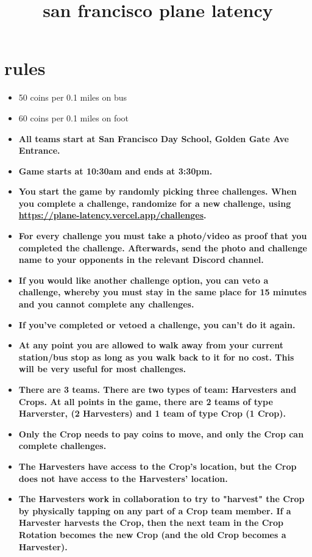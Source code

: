 \documentclass{article}
\title{san francisco plane latency}
\author{}
\date{}
\begin{document}
\maketitle

\section{rules}
\begin{itemize}
    \item 50 coins per 0.1 miles on bus
    \item 60 coins per 0.1 miles on foot
    \item \textbf{All teams start at San Francisco Day School, Golden Gate Ave Entrance.}
    \item \textbf{Game starts at 10:30am and ends at 3:30pm.}
    \item \textbf{You start the game by randomly picking three challenges. When you complete a challenge, randomize for a new challenge, using \url{https://plane-latency.vercel.app/challenges}.}
    \item \textbf{For every challenge you must take a photo/video as proof that you completed the challenge. Afterwards, send the photo and challenge name to your opponents in the relevant Discord channel.}
    \item \textbf{If you would like another challenge option, you can veto a challenge, whereby you must stay in the same place for 15 minutes and you cannot complete any challenges.}
    \item \textbf{If you've completed or vetoed a challenge, you can't do it again.}
    \item \textbf{At any point you are allowed to walk away from your current station/bus stop as long as you walk back to it for no cost. This will be very useful for most challenges.}
    \item \textbf{There are 3 teams. There are two types of team: Harvesters and Crops. At all points in the game, there are 2 teams of type Harverster, (2 Harvesters) and 1 team of type Crop (1 Crop).}
    \item \textbf{Only the Crop needs to pay coins to move, and only the Crop can complete challenges.}
    \item \textbf{The Harvesters have access to the Crop's location, but the Crop does not have access to the Harvesters' location.}
    \item \textbf{The Harvesters work in collaboration to try to "harvest" the Crop by physically tapping on any part of a Crop team member. If a Harvester harvests the Crop, then the next team in the Crop Rotation becomes the new Crop (and the old Crop becomes a Harvester). }

\end{itemize}
\end{document}
